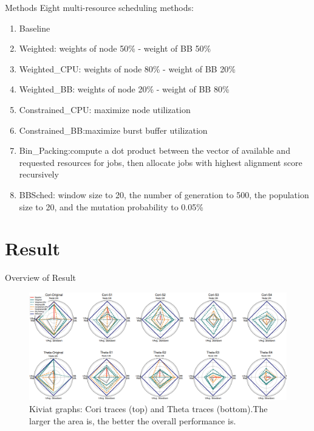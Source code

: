 \documentclass[aspectratio=1610]{beamer}
\begin{document}
\begin{frame}{Methods}
    Eight multi-resource scheduling methods:
\begin{enumerate}
    \item Baseline
    \item Weighted: weights of node 50\% - weight of BB 50\%
    \item Weighted\_CPU: weights of node 80\% - weight of BB 20\%
    \item Weighted\_BB:  weights of node 20\% - weight of BB 80\%
    \item Constrained\_CPU: maximize node utilization
    \item Constrained\_BB:maximize burst buffer utilization 
    \item Bin\_Packing:compute a dot product between the vector of available and requested resources for jobs, then allocate jobs with highest alignment score recursively
    \item BBSched: window size to 20, the number of generation to 500, the population size to 20, and the mutation probability to 0.05\%
\end{enumerate}
\end{frame}

\section{Result}

\begin{frame}{Overview of Result}
    \begin{figure}
        \centering
        \includegraphics[scale=0.247]{pic/overall_performence.png}
        \caption{Kiviat graphs: Cori traces (top) and Theta traces (bottom).The
            larger the area is, the better the overall performance is.}
        \label{fig:my_label}
    \end{figure}
\end{frame}
\end{document}
